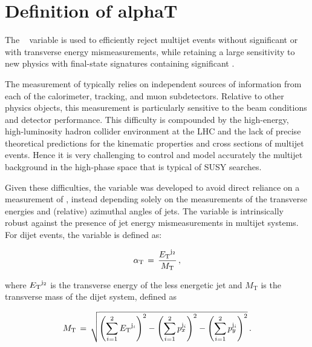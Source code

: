 \section{Definition of alphaT}
\label{sec:alphatdef}

The \alphat~\cite{Randall:2008rw, CMS:2008vya, CMS-PAS-SUS-09-001} variable is used to
efficiently reject multijet events without significant \met or with
transverse energy mismeasurements, while retaining a large sensitivity
to new physics with final-state signatures containing significant
\met.

The measurement of \met typically relies on independent sources of
information from each of the calorimeter, tracking, and muon
subdetectors. Relative to other physics objects, this
measurement is particularly sensitive to the beam conditions and
detector performance. This difficulty is compounded by the
high-energy, high-luminosity hadron collider environment at the LHC
and the lack of precise theoretical predictions for the kinematic
properties and cross sections of multijet events. Hence it is very
challenging to control and model accurately the multijet background in
the high-\met phase space that is typical of SUSY searches.

Given these difficulties, the variable \alphat was developed to avoid
direct reliance on a measurement of \met, instead depending solely on
the measurements of the transverse energies and (relative) azimuthal
angles of jets. The variable is
intrinsically robust against the presence of jet energy
mismeasurements in multijet systems.\\
For dijet events, the \alphat variable is defined
as:

\begin{equation}
\label{eq:alphat}
\alpha_{\text{T}}\, =\, \frac{{E_{\text T}}^{{\rm j}_2}}{M_\text{T}} \, ,
\end{equation}

where ${E_{\text T}}^{\rm j_2}$ is the transverse energy of the less energetic
jet and $M_\text{T}$ is the transverse mass of the dijet system,
defined as

\begin{equation}
  \label{eq:mt}
  M_\text{T}\, = \,\sqrt{ \left( \sum_{i=1}^2 {E_{\text T}}^{{\rm j}_i}
    \right)^2 - \left( \sum_{i=1}^2 p_x^{{\rm j}_i} \right)^2 - \left(
      \sum_{i=1}^2 p_y^{{\rm j}_i} \right)^2} \, .
\end{equation}

